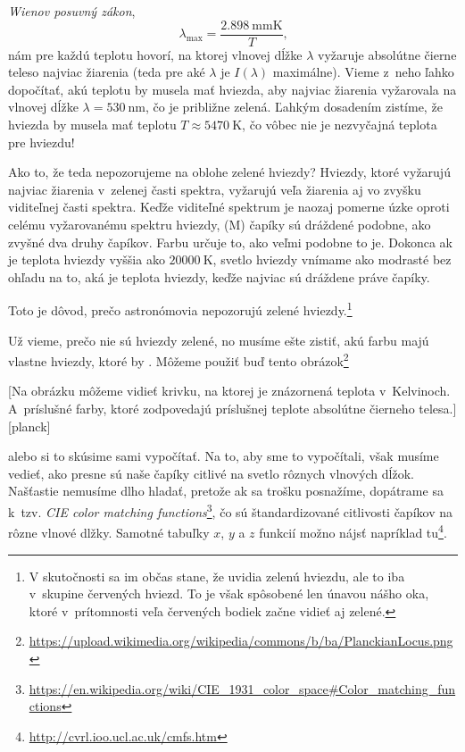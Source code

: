 \emph{Wienov posuvný zákon},
$$
  \lambda_{\text{max}} = \frac{\SI{2.898}{\milli\metre\kelvin}}{T}\text{,}
$$
nám pre každú teplotu hovorí, na ktorej vlnovej dĺžke $\lambda$ vyžaruje absolútne čierne teleso najviac žiarenia (teda pre aké $\lambda$ je $I(\lambda)$ maximálne).
Vieme z~neho ľahko dopočítať, akú teplotu by musela mať hviezda, aby najviac žiarenia vyžarovala na vlnovej dĺžke $\lambda = \SI{530}{\nano\metre}$, čo je približne zelená.
Ľahkým dosadením zistíme, že hviezda by musela mať teplotu $T \approx \SI{5470}{\kelvin}$, čo vôbec nie je nezvyčajná teplota pre hviezdu! 

Ako to, že teda nepozorujeme na oblohe zelené hviezdy? Hviezdy, ktoré vyžarujú najviac žiarenia v~zelenej časti spektra, vyžarujú veľa žiarenia aj vo zvyšku viditeľnej časti spektra.
Keďže viditeľné spektrum je naozaj pomerne úzke oproti celému vyžarovanému spektru hviezdy,  (M) čapíky sú dráždené podobne, ako zvyšné dva druhy čapíkov.
Farbu určuje to, ako veľmi podobne to je. Dokonca ak je teplota hviezdy vyššia ako $\SI{20000}{\kelvin}$, svetlo hviezdy vnímame ako modrasté bez ohľadu na to, aká je teplota hviezdy,
keďže najviac sú dráždene práve  čapíky.

Toto je dôvod, prečo astronómovia nepozorujú zelené hviezdy.\footnote{V skutočnosti sa im občas stane,
že uvidia zelenú hviezdu, ale to iba v~skupine červených hviezd. To je však spôsobené len únavou nášho oka, ktoré v~prítomnosti veľa červených bodiek začne vidieť aj zelené.}

Už vieme, prečo nie sú hviezdy zelené, no musíme ešte zistiť, akú farbu majú vlastne hviezdy, ktoré by .
Môžeme použiť buď tento obrázok\footnote{\url{https://upload.wikimedia.org/wikipedia/commons/b/ba/PlanckianLocus.png}}

[Na obrázku môžeme vidieť krivku, na ktorej je znázornená teplota v~Kelvinoch. A~príslušné farby, ktoré zodpovedajú príslušnej teplote absolútne čierneho telesa.][planck]

alebo si to skúsime sami vypočítať. Na to, aby sme to vypočítali, však musíme vedieť, ako presne sú naše čapíky citlivé na svetlo rôznych vlnových dĺžok.
Našťastie nemusíme dlho hladať, pretože ak sa trošku posnažíme, dopátrame sa k~tzv.
\emph{CIE color matching functions}\footnote{\url{https://en.wikipedia.org/wiki/CIE_1931_color_space\#Color_matching_functions}},
čo sú štandardizované citlivosti čapíkov na rôzne vlnové dlžky. Samotné tabuľky $x$, $y$ a $z$ funkcií možno nájsť napríklad tu\footnote{\url{http://cvrl.ioo.ucl.ac.uk/cmfs.htm}}.

